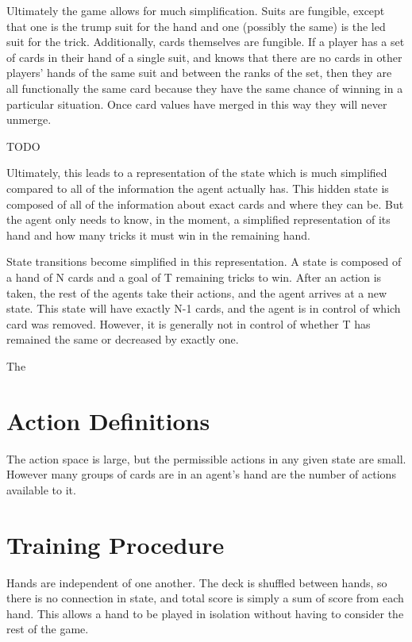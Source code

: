 \documentclass[10pt]{article} %
\begin{document}
Ultimately the game allows for much simplification. Suits are fungible, except that one is the trump suit for the hand and one (possibly the same) is the led suit for the trick. Additionally, cards themselves are fungible. If a player has a set of cards in their hand of a single suit, and knows that there are no cards in other players’ hands of the same suit and between the ranks of the set, then they are all functionally the same card because they have the same chance of winning in a particular situation. Once card values have merged in this way they will never unmerge.

TODO

Ultimately, this leads to a representation of the state which is much simplified compared to all of the information the agent actually has. This hidden state is composed of all of the information about exact cards and where they can be. But the agent only needs to know, in the moment, a simplified representation of its hand and how many tricks it must win in the remaining hand.

State transitions become simplified in this representation. A state is composed of a hand of N cards and a goal of T remaining tricks to win. After an action is taken, the rest of the agents take their actions, and the agent arrives at a new state. This state will have exactly N-1 cards, and the agent is in control of which card was removed. However, it is generally not in control of whether T has remained the same or decreased by exactly one.

The 

\section{Action Definitions}

The action space is large, but the permissible actions in any given state are small. However many groups of cards are in an agent’s hand are the number of actions available to it.

\section{Training Procedure}

Hands are independent of one another. The deck is shuffled between hands, so there is no connection in state, and total score is simply a sum of score from each hand. This allows a hand to be played in isolation without having to consider the rest of the game.
\end{document}
